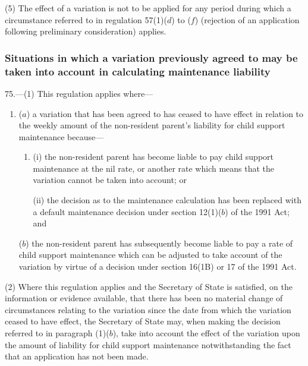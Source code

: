 \documentclass[12pt,a4paper]{article}
\begin{document}
(5) The effect of a variation is not to be applied for any period during which a circumstance referred to in regulation 57(1)($d$)  to ($f$)  (rejection of an application following preliminary consideration) applies.


\subsubsection[75. Situations in which a variation previously agreed to may be taken into account in calculating maintenance liability]{Situations in which a variation previously agreed to may be taken into account in calculating maintenance liability}

75.---(1)  This regulation applies where—
\begin{enumerate}\item[]
($a$) a variation that has been agreed to has ceased to have effect in relation to the weekly amount of the non-resident parent’s liability for child support maintenance because—
\begin{enumerate}\item[]
(i) the non-resident parent has become liable to pay child support maintenance at the nil rate, or another rate which means that the variation cannot be taken into account; or

(ii) the decision as to the maintenance calculation has been replaced with a default maintenance decision under section 12(1)($b$)  of the 1991 Act; and
\end{enumerate}

($b$) the non-resident parent has subsequently become liable to pay a rate of child support maintenance which can be adjusted to take account of the variation by virtue of a decision under section 16(1B) or 17 of the 1991 Act.
\end{enumerate}

(2) Where this regulation applies 
and the Secretary of State is satisfied, on the information or evidence available, that there has been no material change of circumstances relating to the variation since the date from which the variation ceased to have effect,  %
the Secretary of State may, when making the decision referred to in paragraph (1)($b$), take into account the effect of the variation upon the amount of liability for child support maintenance notwithstanding the fact that an application has not been made.
\end{document}

